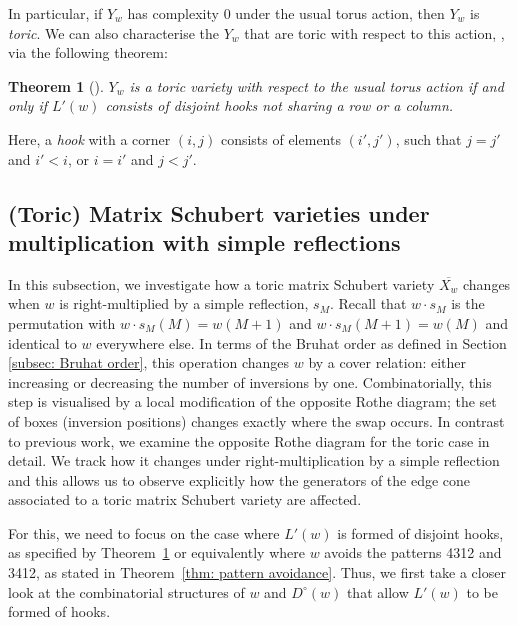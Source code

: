 \documentclass[11pt]{amsart}
\newtheorem{theorem}{Theorem}[section]
\theoremstyle{definition}
\theoremstyle{definition}
\theoremstyle{definition}
\theoremstyle{definition}
\begin{document}
  \noindent In particular, if $Y_w$ has complexity $0$ under the usual torus action, then $Y_w$ is \emph{toric}. We can also characterise the $Y_w$ that are toric with respect to this action,  \cite{escobar2016toric}, via the following theorem:
\begin{theorem}[{\cite[Theorem 3.4]{escobar2016toric}}]\label{thm:toric_desc}
    $Y_w$ is a toric variety with respect to the usual torus action if and only if $L'(w)$ consists of disjoint hooks not sharing a row or a column.
\end{theorem}
 \noindent Here, a \textit{hook} with a corner $(i,j)$ consists of elements $(i',j')$, such that $j=j'$ and $i'< i$, or $i=i'$ and $j < j'$.

\subsection{(Toric) Matrix Schubert varieties under multiplication with simple reflections}\label{subsec: toric ms} 
\noindent In this subsection, we investigate how a toric matrix Schubert variety $\overline{X_w}$ changes when $w$ is right-multiplied by a simple reflection, $s_M$. Recall that $w\cdot s_M$ is the permutation with $w\cdot s_M (M) = w(M+1)$ and $w\cdot s_M (M+1) = w(M)$ and identical to $w$ everywhere else. In terms of the Bruhat order as defined in Section \ref{subsec: Bruhat order}, this operation changes $w$ by a cover relation: either increasing or decreasing the number of inversions by one. Combinatorially, this step is visualised by a local modification of the opposite Rothe diagram; the set of boxes (inversion positions) changes exactly where the swap occurs. 
In contrast to previous work, we examine the opposite Rothe diagram for the toric case in detail. 
We track how it changes under right-multiplication by a simple reflection and this allows us to observe explicitly how the generators of the edge cone associated to a toric matrix Schubert variety are affected. 

For this, we need to focus on the case where $L'(w)$ is formed of disjoint hooks, as specified by Theorem~\ref{thm:toric_desc} or equivalently where $w$ avoids the patterns 4312 and 3412, as stated in Theorem~\ref{thm: pattern avoidance}. 
Thus, we first take a closer look at the combinatorial structures of $w$ and $D^\circ(w)$ that allow 
$L'(w)$ to be formed of hooks. 
\end{document}

